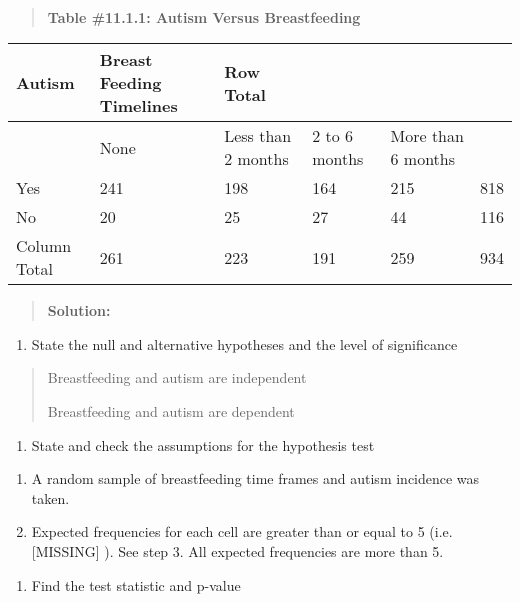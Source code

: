 \documentclass[]{book}
\providecommand{\tightlist}{%
  \setlength{\itemsep}{0pt}\setlength{\parskip}{0pt}}
\begin{document}
\textbf{\\
}

\begin{quote}
\textbf{Table \#11.1.1: Autism Versus Breastfeeding}
\end{quote}

\begin{longtable}[]{@{}llllll@{}}
\toprule
Autism & Breast Feeding Timelines & Row Total & & &\tabularnewline
\midrule
\endhead
& None & Less than 2 months & 2 to 6 months & More than 6 months &\tabularnewline
Yes & 241 & 198 & 164 & 215 & 818\tabularnewline
No & 20 & 25 & 27 & 44 & 116\tabularnewline
Column Total & 261 & 223 & 191 & 259 & 934\tabularnewline
\bottomrule
\end{longtable}

\begin{quote}
\textbf{Solution:}
\end{quote}

\begin{enumerate}
\def\labelenumi{\arabic{enumi}.}
\tightlist
\item
  State the null and alternative hypotheses and the level of significance
\end{enumerate}

\begin{quote}
Breastfeeding and autism are independent

Breastfeeding and autism are dependent
\end{quote}

\begin{enumerate}
\def\labelenumi{\arabic{enumi}.}
\setcounter{enumi}{1}
\tightlist
\item
  State and check the assumptions for the hypothesis test
\end{enumerate}

\begin{enumerate}
\def\labelenumi{\alph{enumi}.}
\item
  A random sample of breastfeeding time frames and autism incidence was taken.
\item
  Expected frequencies for each cell are greater than or equal to 5 (i.e. {[}MISSING{]} ). See step 3. All expected frequencies are more than 5.
\end{enumerate}

\begin{enumerate}
\def\labelenumi{\arabic{enumi}.}
\setcounter{enumi}{2}
\tightlist
\item
  Find the test statistic and p-value
\end{enumerate}
\end{document}
